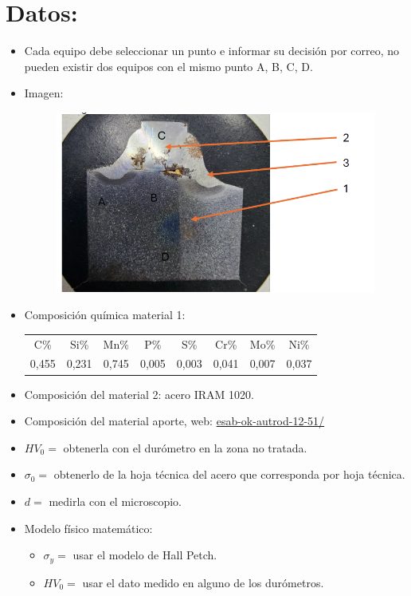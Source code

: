 \documentclass[12pt,a4paper]{article}
\begin{document}
\section{Datos:}
\begin{itemize}
    \item Cada equipo debe seleccionar un punto e informar su decisión por correo, no pueden existir dos equipos con el mismo punto A, B, C, D.
    \item Imagen:
    \begin{figure}[h]
        \centering
        \includegraphics[width=0.5\linewidth]{figuras/imagen 1.png}
        \label{figura1}
    \end{figure}
    \item Composición química material 1:
        \begin{table}[h]
            \begin{tabular}{|c|c|c|c|c|c|c|c|}
            C\%   & Si\%  & Mn\%  & P\%   & S\%   & Cr\%  & Mo\%  & Ni\%  \\
            0,455 & 0,231 & 0,745 & 0,005 & 0,003 & 0,041 & 0,007 & 0,037
            \end{tabular}
        \end{table}
    \item Composición del material 2: acero IRAM 1020.
    \item Composición del material aporte, web: \href{https://esab.com/ar/sam_es/products-solutions/product/filler-metals/mild-steel/mig-wires-tig-rods-gmaw-gtaw/ok-autrod-12-51/}{esab-ok-autrod-12-51/}
    \item \(\textit{HV}_0=\) obtenerla con el durómetro en la zona no tratada.
    \item \(\sigma_0=\) obtenerlo de la hoja técnica del acero que corresponda por hoja técnica.
    \item \(d=\) medirla con el microscopio.
    \item Modelo físico matemático:
        \begin{itemize}
            \item \(\sigma_y=\) usar el modelo de Hall Petch.
            \item \(\textit{HV}_0=\) usar el dato medido en alguno de los durómetros.
        \end{itemize}
\end{itemize}
\end{document}
